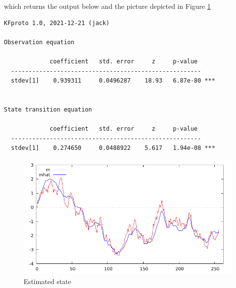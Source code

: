 \documentclass[a4paper]{article}
\begin{document}
which returns the output below and the picture depicted in Figure
\ref{fig:state}

\begin{verbatim}
KFproto 1.0, 2021-12-21 (jack)

Observation equation

             coefficient   std. error     z     p-value 
  ------------------------------------------------------
  stdev[1]    0.939311     0.0496287    18.93   6.87e-80 ***


State transition equation

             coefficient   std. error     z     p-value 
  ------------------------------------------------------
  stdev[1]    0.274650     0.0488922    5.617   1.94e-08 ***
\end{verbatim}
\begin{figure}[hb]
  \centering
  \includegraphics[scale=0.7]{state}
  \caption{Estimated state}\label{fig:state}
\end{figure}
\end{document}

